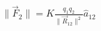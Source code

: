 \documentclass[preview]{standalone}
\begin{document}
\begin{align*}
\|\vec{F}_2\| = K \frac{q_1 q_2}{\|\vec{R}_{12}\|^2} \hat{a}_{12}
\end{align*}
\end{document}

